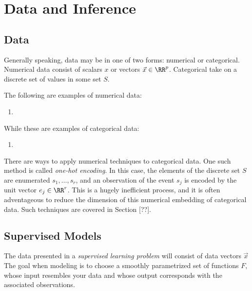 \section{Data and Inference}
\label{sec:data}

\subsection{Data}

Generally speaking, data may be in one of two forms: numerical or categorical. Numerical data consist of scalars $x$ or vectors $\vec{x} \in \RR^p$. Categorical take on a discrete set of values in some set $S$.

The following are examples of numerical data:
\begin{enumerate}
\item 
\end{enumerate}

While these are examples of categorical data:
\begin{enumerate}
\item 
\end{enumerate}

There are ways to apply numerical techniques to categorical data. One such method is called \emph{one-hot encoding}. In this case, the elements of the discrete set $S$ are enumerated $s_1,\ldots,s_r$, and an observation of the event $s_j$ is encoded by the unit vector $e_j \in \RR^r$. This is a hugely inefficient process, and it is often adventageous to reduce the dimension of this numerical embedding of categorical data. Such techniques are covered in Section [??].

\subsection{Supervised Models}

The data presented in a \emph{supervised learning problem} will consist of data vectors $\vec{x}$ The goal when modeling is to choose a smoothly parametrized set of functions $F$, whose input resembles your data and whose output corresponds with the associated observations.

